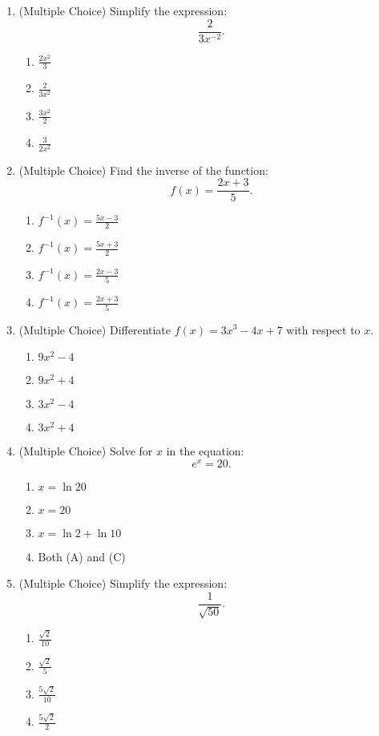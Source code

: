 \documentclass[12pt]{article}
\begin{document}
\begin{enumerate}[label=\textbf{Question \arabic*:}]
  \item (Multiple Choice) Simplify the expression:
    \[
    \frac{2}{3x^{-2}}.
    \]
    \begin{enumerate}[label=(\Alph*)]
      \item \(\frac{2x^2}{3}\)
      \item \(\frac{2}{3x^2}\)
      \item \(\frac{3x^2}{2}\)
      \item \(\frac{3}{2x^2}\)
    \end{enumerate}
    
  \item (Multiple Choice) Find the inverse of the function:
    \[
    f(x) = \frac{2x+3}{5}.
    \]
    \begin{enumerate}[label=(\Alph*)]
      \item \(f^{-1}(x) = \frac{5x-3}{2}\)
      \item \(f^{-1}(x) = \frac{5x+3}{2}\)
      \item \(f^{-1}(x) = \frac{2x-3}{5}\)
      \item \(f^{-1}(x) = \frac{2x+3}{5}\)
    \end{enumerate}
    
  \item (Multiple Choice) Differentiate \(f(x) = 3x^3 - 4x + 7\) with respect to \(x\).
    \begin{enumerate}[label=(\Alph*)]
      \item \(9x^2 - 4\)
      \item \(9x^2 + 4\)
      \item \(3x^2 - 4\)
      \item \(3x^2 + 4\)
    \end{enumerate}
    
  \item (Multiple Choice) Solve for \(x\) in the equation:
    \[
    e^x = 20.
    \]
    \begin{enumerate}[label=(\Alph*)]
      \item \(x = \ln 20\)
      \item \(x = 20\)
      \item \(x = \ln 2 + \ln 10\)
      \item Both (A) and (C)
    \end{enumerate}
    
  \item (Multiple Choice) Simplify the expression:
    \[
    \frac{1}{\sqrt{50}}.
    \]
    \begin{enumerate}[label=(\Alph*)]
      \item \(\frac{\sqrt{2}}{10}\)
      \item \(\frac{\sqrt{2}}{5}\)
      \item \(\frac{5\sqrt{2}}{10}\)
      \item \(\frac{5\sqrt{2}}{2}\)
    \end{enumerate}
    

\end{enumerate}
\end{document}
